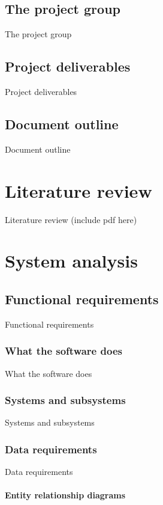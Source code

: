 \chapter{The project group}
The project group

\chapter{Project deliverables}
Project deliverables

\chapter{Document outline}
Document outline

\part{Literature review}
Literature review
(include pdf here)

\part{System analysis}

\chapter{Functional requirements}
Functional requirements

\section{What the software does}
What the software does

\section{Systems and subsystems}
Systems and subsystems

\section{Data requirements}
Data requirements

\subsection{Entity relationship diagrams}
